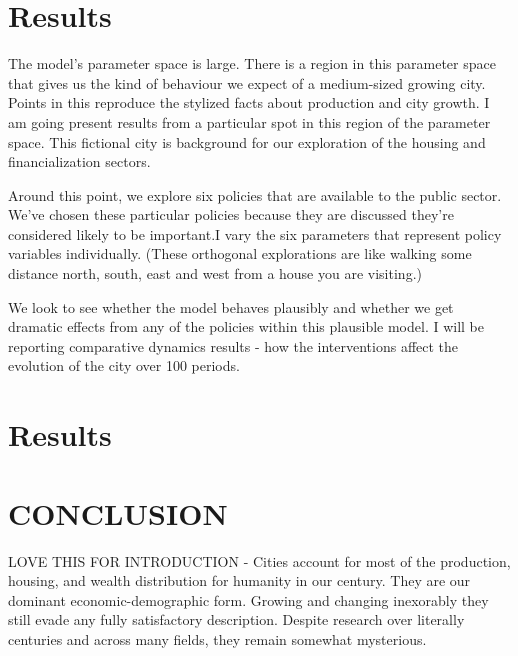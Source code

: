 \documentclass[]{article}
\begin{document}

\section{Results}
The model's parameter space is large. 
There is a region in this parameter space that gives us the kind of behaviour we expect of a medium-sized growing city. Points in this reproduce the stylized facts about production and city growth. I am going present results from a particular spot in this region of the parameter space. This fictional city is  background for our exploration of the housing and financialization sectors.

Around this point, we explore six policies that are available to the public sector. We’ve chosen these particular policies because they are discussed they’re considered likely to be important.I vary the six parameters that represent policy variables individually.  (These orthogonal explorations are like walking some distance north, south, east and west from a house you are visiting.)

We look to see whether the model behaves plausibly and
whether we get dramatic effects from any of the policies within this plausible model. I will be reporting comparative dynamics results - how the interventions affect the evolution of the city over 100 periods. 

\section{Results}
%

\section{CONCLUSION}

LOVE THIS FOR INTRODUCTION - Cities account for most of the production, housing, and wealth distribution for humanity in our century. They are our dominant economic-demographic form. Growing and changing inexorably they still evade any fully satisfactory description. Despite research over literally centuries and across many fields, they remain somewhat mysterious.
\end{document}
